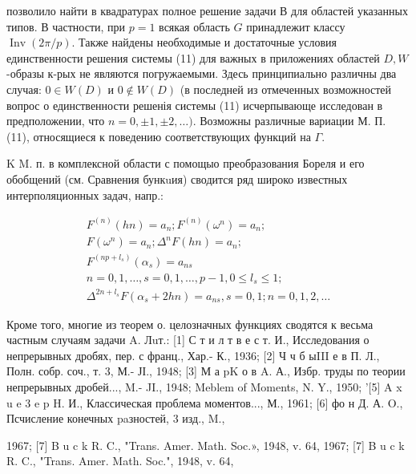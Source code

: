 \documentclass[10pt]{article}
\begin{document}
позволило найти в квадратурах полное решение задачи В для областей указанных типов. В частности, при $p=1$ всякая область $G$ принадлежит классу $\operatorname{Inv}(2 \pi / p)$. Также найдены необходимые и достаточные условия единственности решения системы (11) для важных в приложениях областей $D, W$-образы к-рых не являются погружаемыми. Здесь принципиально различны два случая: $0 \in W(D)$ и $0 \notin W(D)$ (в последней из отмеченных возможностей вопрос о единственности решенія системы (11) исчерпывающе исследован в предположении, что $n=0, \pm 1, \pm 2, \ldots)$. Возможны различные вариации М. П. (11), относящиеся к поведению соответствующих функций на $\Gamma$.



K M. п. в комплексной области с помощыо преобразования Бореля и его обобщений (см. Сравнения бункuия) сводится ряд широко известных интерполяционных задач, напр.:



\[

\begin{gathered}

F^{(n)}(h n)=a_{n} ; F^{(n)}\left(\omega^{n}\right)=a_{n} ; \\

F\left(\omega^{n}\right)=a_{n} ; \Delta^{n} F(h n)=a_{n} ; \\

F^{\left(n p+l_{s}\right)}\left(\alpha_{s}\right)=a_{n s} \\

n=0,1, \ldots, s=0,1, \ldots, p-1,0 \leqslant l_{s} \leqslant 1 ; \\

\Delta^{2 n+l_{s}} F\left(\alpha_{s}+2 h n\right)=a_{n s}, s=0,1 ; n=0,1,2, \ldots

\end{gathered}

\]



Кроме того, многие из теорем о. целозначных функциях сводятся к весьма частным случаям задачи A. Лuт.: [1] С т и л т в е с т. И., Исследования о непрерывных дробях, пер. с франц., Хар.- К., 1936; [2] Ч ч б ыIII е в П. Л., Полн. собр. соч., т. 3, М.- ЈІ., 1948; [3] М а pK о в A. А., Избр. труды по теории непрерывных дробей..., M.- JI., 1948; Meblem of Moments, N. Y., 1950; '[5] A x u e 3 e p H. И., Классическая проблема моментов..., М., 1961; [6] фо н Д. А. O., Псчисление конечных paзностей, 3 изд., M.,

1967; [7] B u c k R. C., "Trans. Amer. Math. Soc.», 1948, v. 64, 1967; [7] B u c k R. C., "Trans. Amer. Math. Soc.", 1948, v. 64,
\end{document}
